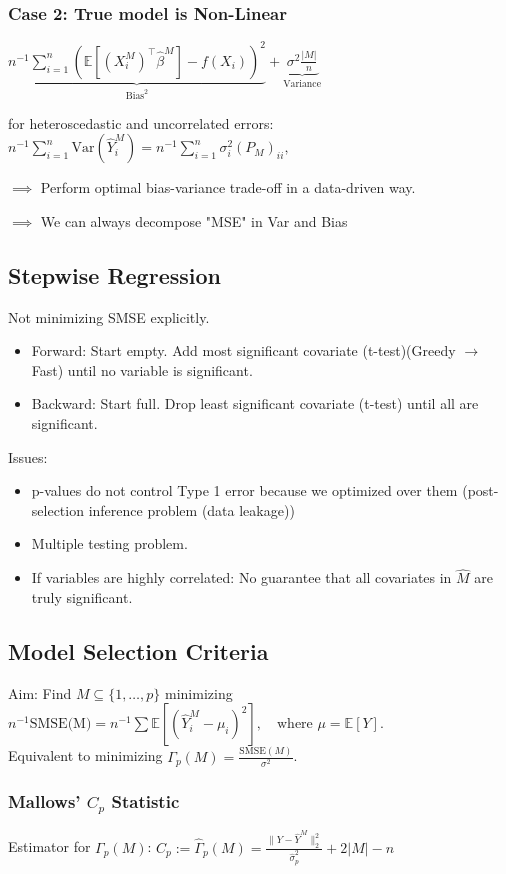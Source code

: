 \subsubsection*{Case 2: True model is Non-Linear}

$\underbrace{n^{-1} \sum_{i=1}^n (\mathbb{E}[(X_i^M)^\top \hat{\beta}^M] - f(X_i))^2}_{\text{Bias}^2} + \underbrace{\sigma^2 \frac{|M|}{n}}_{\text{Variance}}$

for heteroscedastic and uncorrelated errors: $ n^{-1} \sum_{i=1}^{n} \mathrm{Var}(\hat{Y}_{i}^{M}) = n^{-1} \sum_{i=1}^{n} \sigma_{i}^{2} (P_{M})_{ii}, $

$\implies$ Perform optimal bias-variance trade-off in a data-driven way.

$\implies$ We can always decompose "MSE" in Var and Bias

\subsection{Stepwise Regression}
Not minimizing SMSE explicitly.
\begin{itemize}
    \item Forward: Start empty. Add most significant covariate (t-test)(Greedy $\to$ Fast) until no variable is significant.
    \item Backward: Start full. Drop least significant covariate (t-test) until all are significant.
\end{itemize}
Issues:
\begin{itemize}
    \item p-values do not control Type 1 error because we optimized over them (post-selection inference problem (data leakage))
    \item Multiple testing problem.
    \item If variables are highly correlated: No guarantee that all covariates in $\hat{M}$ are truly significant.
\end{itemize}

\subsection{Model Selection Criteria}
Aim: Find $M \subseteq \{1, \dots, p\}$ minimizing $n^{-1}\text{SMSE(M)} = n^{-1}\sum \mathbb{E}[(\hat{Y}_i^M - \mu_i)^2] , \quad \text{where } \mu = \mathbb{E}[Y]$.
\\ Equivalent to minimizing $\Gamma_p(M) = \frac{\text{SMSE}(M)}{\sigma^2}$.

\subsubsection{Mallows' $C_p$ Statistic}
Estimator for $\Gamma_p(M)$:
$C_p := \hat{\Gamma}_p(M) = \frac{\|Y - \hat{Y}^M\|_2^2}{\hat{\sigma}_p^2} + 2|M| - n$

